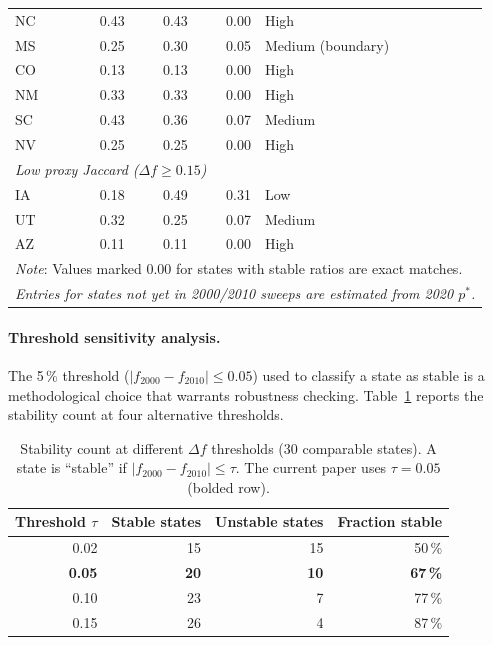 \begin{table}[h]
\begin{tabular}{l r r r l}
NC  & 0.43 & 0.43 & 0.00 & High \\
MS  & 0.25 & 0.30 & 0.05 & Medium (boundary) \\
CO  & 0.13 & 0.13 & 0.00 & High \\
NM  & 0.33 & 0.33 & 0.00 & High \\
SC  & 0.43 & 0.36 & 0.07 & Medium \\
NV  & 0.25 & 0.25 & 0.00 & High \\
\midrule
\multicolumn{5}{l}{\textit{Low proxy Jaccard ($\Delta f \geq 0.15$)}} \\
IA  & 0.18 & 0.49 & 0.31 & Low \\
UT  & 0.32 & 0.25 & 0.07 & Medium \\
AZ  & 0.11 & 0.11 & 0.00 & High \\
\bottomrule
\multicolumn{5}{l}{\textit{Note}: Values marked 0.00 for states with stable ratios are exact matches.} \\
\multicolumn{5}{l}{\textit{Entries for states not yet in 2000/2010 sweeps are estimated from 2020 $p^*$.}} \\
\end{tabular}
\end{table}

\paragraph{Threshold sensitivity analysis.}
The 5\,\% threshold ($|f_{2000} - f_{2010}| \leq 0.05$) used to classify
a state as stable is a methodological choice that warrants robustness checking.
Table~\ref{tab:threshold-sensitivity} reports the stability count at four
alternative thresholds.

\begin{table}[h]
\centering
\caption{Stability count at different $\Delta f$ thresholds (30 comparable states).
  A state is ``stable'' if $|f_{2000} - f_{2010}| \leq \tau$.
  The current paper uses $\tau = 0.05$ (bolded row).}
\label{tab:threshold-sensitivity}
\small
\begin{tabular}{r r r r}
\toprule
Threshold $\tau$ & Stable states & Unstable states & Fraction stable \\
\midrule
0.02 & 15 & 15 & 50\,\% \\
\textbf{0.05} & \textbf{20} & \textbf{10} & \textbf{67\,\%} \\
0.10 & 23 & 7  & 77\,\% \\
0.15 & 26 & 4  & 87\,\% \\
\bottomrule
\end{tabular}
\end{table}

